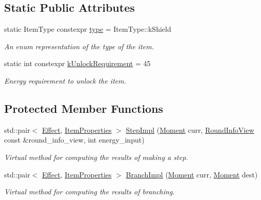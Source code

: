 \subsection*{Static Public Attributes}
\begin{DoxyCompactItemize}
\item 
static Item\+Type constexpr \hyperlink{classitem_1_1_shield_a936299d37c16f407535e373f1f879d34}{type} = Item\+Type\+::k\+Shield
\begin{DoxyCompactList}\small\item\em An enum representation of the type of the item. \end{DoxyCompactList}\item 
\mbox{\label{classitem_1_1_shield_af4d01df72cfe6f4a4b5155ba22afe2a6}} 
static int constexpr \hyperlink{classitem_1_1_shield_af4d01df72cfe6f4a4b5155ba22afe2a6}{k\+Unlock\+Requirement} = 45
\begin{DoxyCompactList}\small\item\em Energy requirement to unlock the item. \end{DoxyCompactList}\end{DoxyCompactItemize}
\subsection*{Protected Member Functions}
\begin{DoxyCompactItemize}
\item 
std\+::pair$<$ \hyperlink{classitem_1_1_effect}{Effect}, \hyperlink{classitem_1_1_item_properties}{Item\+Properties} $>$ \hyperlink{classitem_1_1_shield_a0c446c3f436c4eb221ebafd817df9a5f}{Step\+Impl} (\hyperlink{classtimeplane_1_1_moment}{Moment} curr, \hyperlink{classroundinfo_1_1_round_info_view}{Round\+Info\+View} const \&round\+\_\+info\+\_\+view, int energy\+\_\+input)
\begin{DoxyCompactList}\small\item\em Virtual method for computing the results of making a step. \end{DoxyCompactList}\item 
std\+::pair$<$ \hyperlink{classitem_1_1_effect}{Effect}, \hyperlink{classitem_1_1_item_properties}{Item\+Properties} $>$ \hyperlink{classitem_1_1_shield_a29993d7965fe391d052214cd415eec75}{Branch\+Impl} (\hyperlink{classtimeplane_1_1_moment}{Moment} curr, \hyperlink{classtimeplane_1_1_moment}{Moment} dest)
\begin{DoxyCompactList}\small\item\em Virtual method for computing the results of branching. \end{DoxyCompactList}\end{DoxyCompactItemize}
